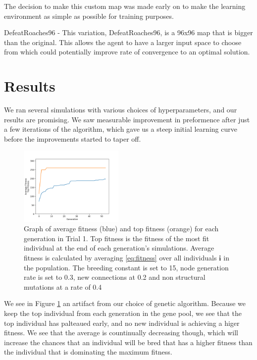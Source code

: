 \documentclass{article}
\begin{document}
\begin{multicols}{2}
The decision to make this custom map was made early on to make the learning environment as simple as possible for training purposes.

DefeatRoaches96 - 
This variation, DefeatRoaches96, is a 96x96 map that is bigger than the original. This allows the agent to have a larger input space to choose from which could potentially improve rate of convergence to an optimal solution. 

\section{Results}
We ran several simulations with various choices of hyperparameters, and our
results are promising. We saw measurable improvement in preformence after just
a few iterations of the algorithm, which gave us a steep initial learning curve
before the improvements started to taper off.

\begin{figure}[H]\label{fig:fitness graph}
\centering
\includegraphics[width=0.45\textwidth]{fig_1}
\begin{changemargin}{0.15in}{0.15in}
  \caption{Graph of average fitness (blue) and top fitness (orange) for each
    generation in Trial 1. Top fitness is the fitness of the most fit individual
    at the end of each generation's simulations. Average fitness is calculated
    by averaging \eqref{eq:fitness} over all individuals $\bm{i}$ in the
    population. The breeding constant is set to 15, node generation rate is set
    to 0.3, new connections at 0.2 and non structural mutations at a rate of
    0.4}
\end{changemargin}
\end{figure}

We see in Figure \ref{fig:fitness graph} an artifact from our choice of genetic
algorithm. Because we keep the top individual from each generation in the gene
pool, we see that the top individual has palteaued early, and no new individual
is achieving a higer fitness. We see that the average is countinually decreasing
though, which will increase the chances that an individual will be bred that has
a higher fitness than the individual that is dominating the maximum fitness.


\end{multicols}
\end{document}
